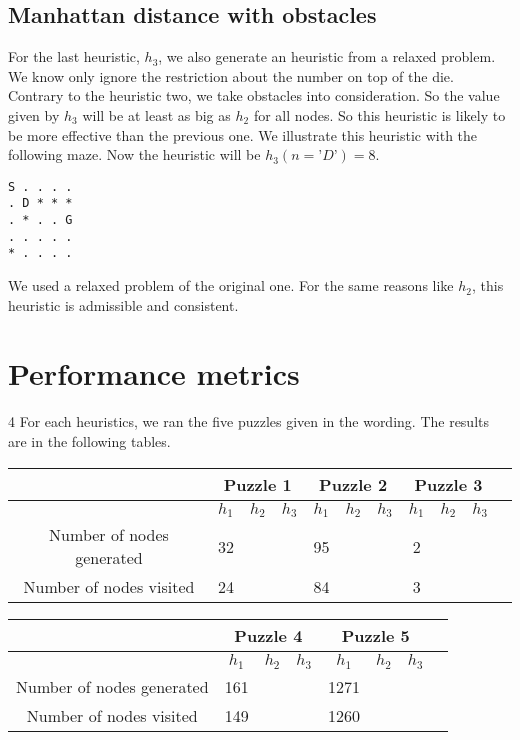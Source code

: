 \documentclass[]{article}
\begin{document}
\subsection{Manhattan distance with obstacles}
For the last heuristic, $h_3$, we also generate an heuristic from a relaxed problem.
We know only ignore the restriction about the number on top of the die.
Contrary to the heuristic two, we take obstacles into consideration.
So the value given by $h_3$ will be at least as big as $h_2$ for all nodes.
So this heuristic is likely to be more effective than the previous one.
We illustrate this heuristic with the following maze.
Now the heuristic will be $h_3(n=’D’) = 8$.

\begin{lstlisting}
S . . . .
. D * * *
. * . . G
. . . . .
* . . . .
\end{lstlisting}

We used a relaxed problem of the original one.
For the same reasons like $h_2$, this heuristic is admissible and consistent.

\section{Performance metrics}
4
For each heuristics, we ran the five puzzles given in the wording.
The results are in the following tables.

\begin{center}
    \begin{tabular}{| c | c | c | c | c | c | c | c | c | c | c |}
      \cline{2-10} & \multicolumn{3}{|c|}{Puzzle 1} & \multicolumn{3}{|c|}{Puzzle 2} & \multicolumn{3}{|c|}{Puzzle 3} \\
      \hline
    & $h_1$ & $h_2$ & $h_3$ & $h_1$ & $h_2$& $h_3$ & $h_1$ &  $h_2$ & $h_3$ \\ \hline
    Number of nodes generated & 32 &       &       & 95 &  &  & 2 &  & \\ \hline
    Number of nodes visited   & 24 &       &       & 84 &  &  & 3 &  & \\ \hline
    \end{tabular}
\end{center}

\begin{center}
    \begin{tabular}{| c | c | c | c | c | c | c | c |}
      \cline{2-7} & \multicolumn{3}{|c|}{Puzzle 4} & \multicolumn{3}{|c|}{Puzzle 5} \\
      \hline
    & $h_1$ & $h_2$ & $h_3$ & $h_1$ & $h_2$& $h_3$ \\ \hline
    Number of nodes generated & 161 &       &       & 1271 &  &   \\ \hline
    Number of nodes visited   & 149 &       &       & 1260 &  &  \\ \hline
    \end{tabular}
\end{center}
\end{document}
